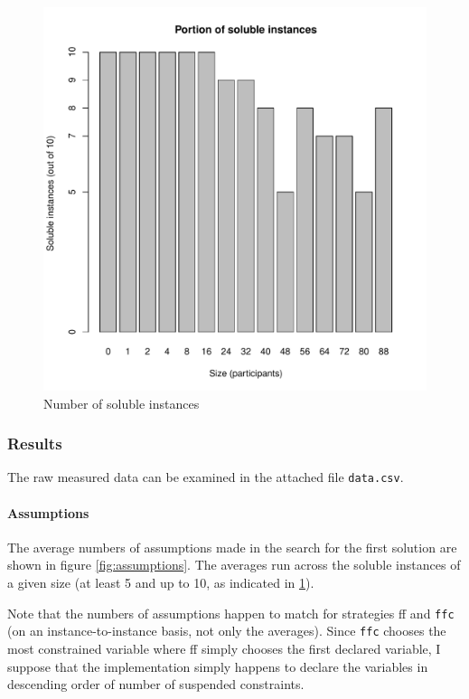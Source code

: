 \documentclass{article}
\newcommand{\file}[1]{\texttt{#1}}
\newcommand{\code}[1]{\texttt{#1}}
\begin{document}
\begin{figure}
\centering
\includegraphics[width=\linewidth]{soluble}
\caption{Number of soluble instances}
\label{fig:soluble}
\end{figure}

\subsubsection{Results}
The raw measured data can be examined in the attached file \file{data.csv}.

\paragraph{Assumptions}
The average numbers of assumptions made in the search for the first solution
are shown in figure \ref{fig:assumptions}.
The averages run across the soluble instances of a given size
(at least 5 and up to 10, as indicated in \ref{fig:soluble}).

Note that the numbers of assumptions happen to match
for strategies \acrshort{ff} and \code{ffc}
(on an instance-to-instance basis, not only the averages).
Since \code{ffc} chooses the most constrained variable
where \acrshort{ff} simply chooses the first declared variable,
I suppose that the implementation simply happens to declare the variables
in descending order of number of suspended constraints.
\end{document}
